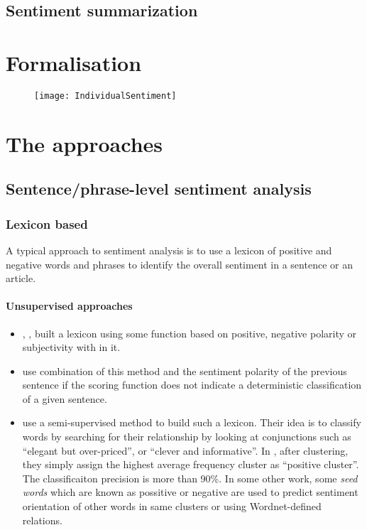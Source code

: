 \documentclass{article}
\begin{document}
  \section{Sentiment summarization}

\chapter{Formalisation}
      \begin{figure}[H]
        \begin{center}
          \texttt{[image: IndividualSentiment]}
        \end{center}
      \end{figure}
    
\chapter{The approaches}

  \section{Sentence/phrase-level sentiment analysis}

    \subsection{Lexicon based}
      
        A typical approach to sentiment analysis is to use a lexicon of positive
  and negative words and phrases to identify the overall sentiment in a sentence
  or an article. 

        \subsubsection{Unsupervised approaches}
          \begin{itemize}
              \item \citet{Wiebe2000}, \citet{Turney2002}, \citet{Pan2010} built
a  lexicon using some function based on positive, negative polarity or
subjectivity  with in it.
              \item \citet{Liu98} use combination of this method and
  the sentiment polarity of the previous sentence if the scoring function does
not
  indicate a deterministic classification of a given sentence.
              \item \citet{Hatzivassiloglou1997}
  use a semi-supervised method to build such a lexicon. Their idea is to
classify
  words by searching for their relationship by looking at conjunctions such as
  ``elegant but over-priced'', or ``clever and informative''. In
  \citet{Hatzivassiloglou1997}, after clustering, they simply assign the highest
  average frequency cluster as ``positive cluster''. The classificaiton
precision
  is more than 90\%. In some other work, some \textit{seed words} which are
known
  as possitive or negative are used to predict sentiment orientation of other
  words in same clusters or using Wordnet-defined relations.      		
          \end{itemize}
      
\end{document}
